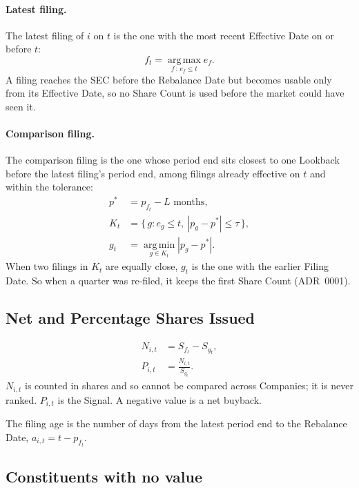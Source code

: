 \documentclass[11pt]{article}
\begin{document}
\paragraph{Latest filing.} The latest filing of $i$ on $t$ is the one with the most recent
Effective Date on or before $t$:
\begin{equation}
  f_t = \operatorname*{arg\,max}_{f \,:\, e_f \le t} e_f .
\end{equation}
A filing reaches the SEC before the Rebalance Date but becomes usable only from its Effective
Date, so no Share Count is used before the market could have seen it.

\paragraph{Comparison filing.} The comparison filing is the one whose period end sits closest
to one Lookback before the latest filing's period end, among filings already effective on $t$
and within the tolerance:
\begin{align}
  p^{*} &= p_{f_t} - L \text{ months}, \\
  K_t &= \{\, g : e_g \le t,\ |p_g - p^{*}| \le \tau \,\}, \\
  g_t &= \operatorname*{arg\,min}_{g \in K_t} |p_g - p^{*}| .
\end{align}
When two filings in $K_t$ are equally close, $g_t$ is the one with the earlier Filing Date. So
when a quarter was re-filed, it keeps the first Share Count (ADR~0001).

\subsection{Net and Percentage Shares Issued}

\begin{align}
  N_{i,t} &= S_{f_t} - S_{g_t}, \\
  P_{i,t} &= \frac{N_{i,t}}{S_{g_t}} .
\end{align}
$N_{i,t}$ is counted in shares and so cannot be compared across Companies; it is never ranked.
$P_{i,t}$ is the Signal. A negative value is a net buyback.

The filing age is the number of days from the latest period end to the Rebalance Date,
$a_{i,t} = t - p_{f_t}$.

\subsection{Constituents with no value}
\end{document}
